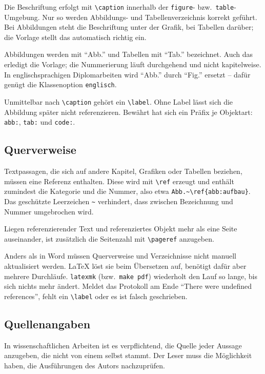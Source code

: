 Die Beschriftung erfolgt mit \lstinline|\caption| innerhalb der
\lstinline|figure|- bzw.\ \lstinline|table|-Umgebung. Nur so werden
Abbildungs- und Tabellenverzeichnis korrekt geführt. Bei Abbildungen steht
die Beschriftung unter der Grafik, bei Tabellen darüber; die Vorlage stellt
das automatisch richtig ein.

Abbildungen werden mit \enquote{Abb.} und Tabellen mit \enquote{Tab.}
bezeichnet. Auch das erledigt die Vorlage; die Nummerierung läuft
durchgehend und nicht kapitelweise. In englischsprachigen Diplomarbeiten
wird \enquote{Abb.} durch \enquote{Fig.} ersetzt -- dafür genügt die
Klassenoption \lstinline|englisch|.

Unmittelbar nach \lstinline|\caption| gehört ein \lstinline|\label|. Ohne
Label lässt sich die Abbildung später nicht referenzieren. Bewährt hat sich
ein Präfix je Objektart: \lstinline|abb:|, \lstinline|tab:| und
\lstinline|code:|.

\subsection{Querverweise}

Textpassagen, die sich auf andere Kapitel, Grafiken oder Tabellen beziehen,
müssen eine Referenz enthalten. Diese wird mit \lstinline|\ref| erzeugt und
enthält zumindest die Kategorie und die Nummer, also etwa
\lstinline|Abb.~\ref{abb:aufbau}|. Das geschützte Leerzeichen
\lstinline|~| verhindert, dass zwischen Bezeichnung und Nummer umgebrochen
wird.

Liegen referenzierender Text und referenziertes Objekt mehr als eine Seite
auseinander, ist zusätzlich die Seitenzahl mit \lstinline|\pageref|
anzugeben.

Anders als in Word müssen Querverweise und Verzeichnisse nicht manuell
aktualisiert werden. \LaTeX{} löst sie beim Übersetzen auf, benötigt dafür
aber mehrere Durchläufe. \lstinline|latexmk| (bzw.\ \lstinline|make pdf|)
wiederholt den Lauf so lange, bis sich nichts mehr ändert. Meldet das
Protokoll am Ende \enquote{There were undefined references}, fehlt ein
\lstinline|\label| oder es ist falsch geschrieben.

\subsection{Quellenangaben}

In wissenschaftlichen Arbeiten ist es verpflichtend, die Quelle jeder
Aussage anzugeben, die nicht von einem selbst stammt. Der Leser muss die
Möglichkeit haben, die Ausführungen des Autors nachzuprüfen.

